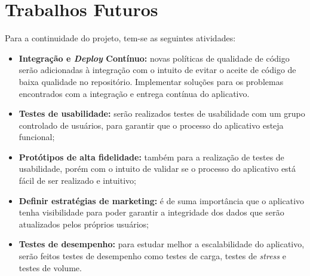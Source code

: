 \section{Trabalhos Futuros}

Para a continuidade do projeto, tem-se as seguintes atividades:

\begin{itemize}
    \item \textbf{Integração e \textit{Deploy} Contínuo:} novas políticas de qualidade de código serão adicionadas à integração com o intuito de evitar o aceite de código de baixa qualidade no repositório. Implementar soluções para os problemas encontrados com a integração e entrega contínua do aplicativo.
    \item \textbf{Testes de usabilidade:} serão realizados testes de usabilidade com um grupo controlado de usuários, para garantir que o processo do aplicativo esteja funcional;
    \item \textbf{Protótipos de alta fidelidade:} também para a realização de testes de usabilidade, porém com o intuito de validar se o processo do aplicativo está fácil de ser realizado e intuitivo;
    \item \textbf{Definir estratégias de marketing:} é de suma importância que o aplicativo tenha visibilidade para poder garantir a integridade dos dados que serão atualizados pelos próprios usuários;
    \item \textbf{Testes de desempenho:} para estudar melhor a escalabilidade do aplicativo, serão feitos testes de desempenho como testes de carga, testes de \textit{stress} e testes de volume.
\end{itemize}
